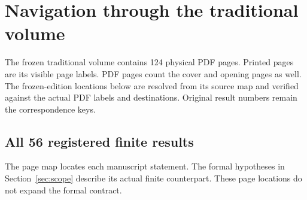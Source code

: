 \section{Navigation through the traditional volume}
\label{sec:traditional-navigation}
The frozen traditional volume contains 124 physical PDF pages. Printed pages are its visible page labels. PDF pages count the cover and opening pages as well. The frozen-edition locations below are resolved from its source map and verified against the actual PDF labels and destinations. Original result numbers remain the correspondence keys.

\subsection{All 56 registered finite results}
The page map locates each manuscript statement. The formal hypotheses in Section~\ref{sec:scope} describe its actual finite counterpart. These page locations do not expand the formal contract.

